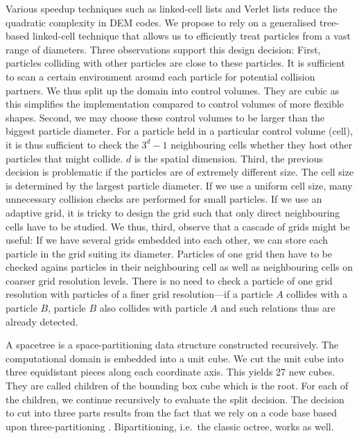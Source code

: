 \documentclass[times,12pt]{article}
\begin{document}
Various speedup techniques such as linked-cell lists \cite{Eckhardt2014} and Verlet lists
\cite{Fleissner, Eckhardt2014} reduce the quadratic complexity in DEM codes.
We propose to rely on a generalised tree-based linked-cell
technique that allows us to efficiently treat particles from a vast range of diameters.
Three observations support this design decision:
First, particles colliding with other particles are close to these particles.
It is sufficient to scan a certain environment around each particle for
potential collision partners.
We thus split up the domain into control volumes.
They are cubic as this simplifies the implementation compared to control volumes
of more flexible shapes.
Second, we may choose these control volumes to be larger than the biggest
particle diameter. 
For a particle held in a particular control volume (cell), it is thus sufficient
to check the $3^d-1$ neighbouring cells whether they host other particles that
might collide. 
$d$ is the spatial dimension.
Third, the previous decision is problematic if the particles are of extremely
different size. 
The cell size is determined by the largest particle diameter. 
If we use a uniform cell size, many unnecessary collision checks are performed
for small particles.
If we use an adaptive grid, it is tricky to design the grid such that only
direct neighbouring cells have to be studied.
We thus, third, observe that a cascade of grids might be useful: If we have
several grids embedded into each other, we can store each particle in the grid
suiting its diameter.
Particles of one grid then have to be checked agains particles in their
neighbouring cell as well as neighbouring cells on coarser grid resolution
levels.
There is no need to check a particle of one grid resolution with particles of a
finer grid resolution---if a particle $A$ collides with a particle $B$, particle
$B$ also collides with particle $A$ and such relations thus are already
detected.

A spacetree is a space-partitioning data structure constructed recursively.
The computational domain is embedded into a unit cube.
We cut the unit cube into three equidistant pieces along each coordinate axis. 
This yields 27 new cubes. 
They are called children of the bounding box cube which is the root.
For each of the children, we continue recursively to evaluate the split
decision. 
The decision to cut into three parts results from the fact that we rely on a
code base based upon three-partitioning \cite{Software:Peano}.
Bipartitioning, i.e.~the classic octree, works as well.
\end{document}
